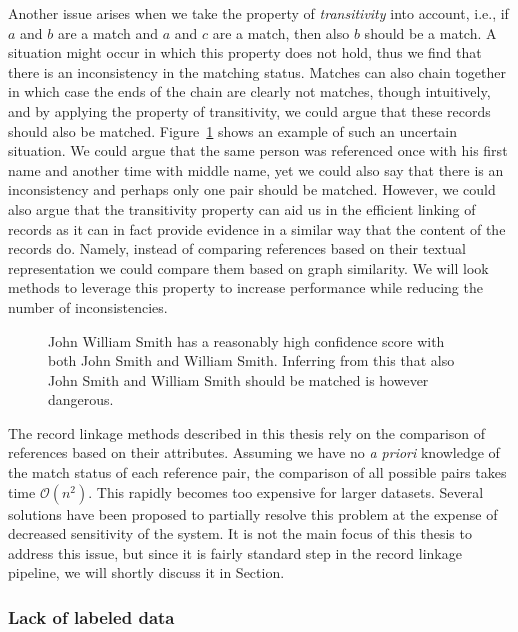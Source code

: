 Another issue arises when we take the property of \emph{transitivity} into account, i.e., if $a$ and $b$ are a match and $a$ and $c$ are a match, then also $b$ should be a match.
A situation might occur in which this property does not hold, thus we find that there is an inconsistency in the matching status.
Matches can also chain together in which case the ends of the chain are clearly not matches, though intuitively, and by applying the property of transitivity, we could argue that these records should also be matched.
Figure~\ref{fig:transitive_closure} shows an example of such an uncertain situation.
We could argue that the same person was referenced once with his first name and another time with middle name, yet we could also say that there is an inconsistency and perhaps only one pair should be matched.
However, we could also argue that the transitivity property can aid us in the efficient linking of records as it can in fact provide evidence in a similar way that the content of the records do.
Namely, instead of comparing references based on their textual representation we could compare them based on graph similarity.
We will look methods to leverage this property to increase performance while reducing the number of inconsistencies.

\begin{figure}
    \centering
    
    \caption{John William Smith has a reasonably high confidence score with both John Smith and William Smith. Inferring from this that also John Smith and William Smith should be matched is however dangerous.}
    \label{fig:transitive_closure}
\end{figure}

The record linkage methods described in this thesis rely on the comparison of references based on their attributes.
Assuming we have no \emph{a priori} knowledge of the match status of each reference pair, the comparison of all possible pairs takes time $\mathcal{O}(n^2)$.
This rapidly becomes too expensive for larger datasets.
Several solutions have been proposed to partially resolve this problem at the expense of decreased sensitivity of the system.
It is not the main focus of this thesis to address this issue, but since it is fairly standard step in the record linkage pipeline, we will shortly discuss it in Section.

\subsubsection{Lack of labeled data}


